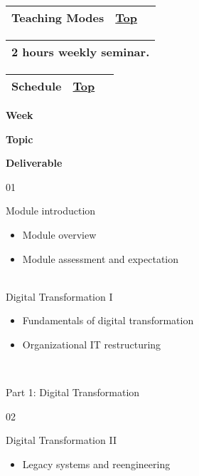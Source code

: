 { }

\begin{longtable}[]{@{}ll@{}}
\toprule
{\protect\hypertarget{Teachingux20Modes}{}{}Teaching Modes} &
{\protect\hyperlink{top}{Top}~~}\tabularnewline
\bottomrule
\end{longtable}

\begin{longtable}[]{@{}l@{}}
\toprule
\protect\hypertarget{ctl00_ctl00_ContentPlaceHolder1_ContentPlaceHolder1_LV_CourseInfo_ctrl0_lblCourseInfo}{}{2
hours weekly seminar.}\tabularnewline
\bottomrule
\end{longtable}

\begin{longtable}[]{@{}ll@{}}
\toprule
{\protect\hypertarget{Schedule}{}{}Schedule} &
{\protect\hyperlink{top}{Top}~~}\tabularnewline
\bottomrule
\end{longtable}

\protect\hypertarget{ctl00_ctl00_ContentPlaceHolder1_ContentPlaceHolder1_LV_CourseInfo_ctrl1_lblCourseInfo}{}{}

\textbf{{{Week}}}

\textbf{{{Topic}}}

\textbf{{{Deliverable}}}

{01}

{Module introduction}

\begin{itemize}
\tightlist
\item
  {Module overview}
\item
  {Module assessment and expectation}
\end{itemize}

~\\
{Digital Transformation I}

\begin{itemize}
\tightlist
\item
  {Fundamentals of digital transformation}
\item
  {Organizational IT restructuring}
\end{itemize}

~

{Part 1: Digital Transformation}

{02}

{Digital Transformation II}

\begin{itemize}
\tightlist
\item
  {Legacy systems and reengineering}
\end{itemize}


